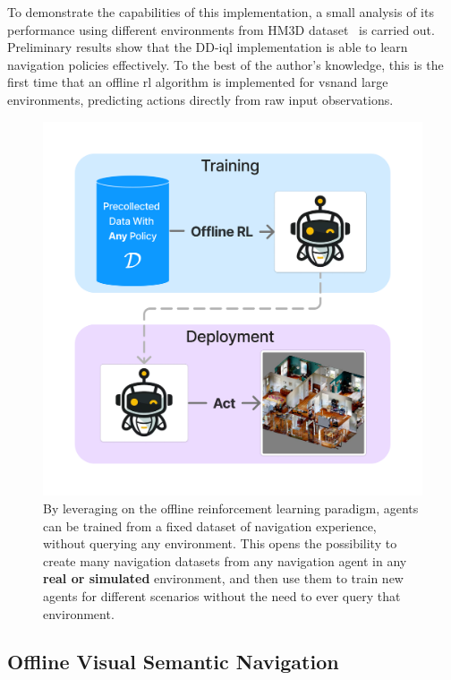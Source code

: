 To demonstrate the capabilities of this implementation, a small analysis of its performance using different environments from HM3D dataset~\cite{Ramakrishnan2021HabitatMatterport3D} is carried out.
Preliminary results show that the DD-\acrshort{iql} implementation is able to learn navigation policies effectively.
To the best of the author's knowledge, this is the first time that an offline \acrshort{rl} algorithm is implemented for \acrshort{vsn}\@ and large environments, predicting actions directly from raw input observations.

\begin{figure}
    \centering
    \includegraphics[width=0.7\linewidth]{figures/offnav/graphical_abstract}
    \caption[Offline RL diagram]{
        By leveraging on the offline reinforcement learning paradigm, agents can be trained from a fixed dataset of navigation experience, without querying any environment.
        This opens the possibility to create many navigation datasets from any navigation agent in any \textbf{real or simulated} environment, and then use them to train new agents for different scenarios without the need to ever query that environment.
    }
    \label{fig:abstract_offnav}
\end{figure}

\subsection{Offline Visual Semantic Navigation}\label{subsec:offline-navigation}

